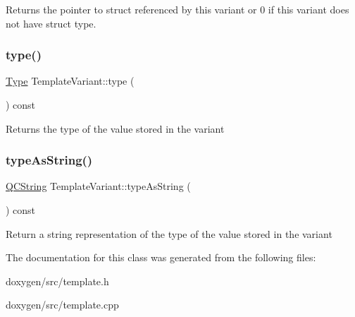 Returns the pointer to struct referenced by this variant or 0 if this variant does not have struct type. \mbox{\label{class_template_variant_a44564decc01226f38116fe78461bb912}} 
\subsubsection{\texorpdfstring{type()}{type()}}
{\footnotesize\ttfamily \mbox{\hyperlink{class_template_variant_a4c0d322ba971480bfbd2a8f418eadc81}{Type}} Template\+Variant\+::type (\begin{DoxyParamCaption}{ }\end{DoxyParamCaption}) const\hspace{0.3cm}{\ttfamily [inline]}}

Returns the type of the value stored in the variant \mbox{\label{class_template_variant_aa3367e7e77d68c0164f83c951906a608}} 
\subsubsection{\texorpdfstring{typeAsString()}{typeAsString()}}
{\footnotesize\ttfamily \mbox{\hyperlink{class_q_c_string}{Q\+C\+String}} Template\+Variant\+::type\+As\+String (\begin{DoxyParamCaption}{ }\end{DoxyParamCaption}) const\hspace{0.3cm}{\ttfamily [inline]}}

Return a string representation of the type of the value stored in the variant 

The documentation for this class was generated from the following files\+:\begin{DoxyCompactItemize}
\item 
doxygen/src/template.\+h\item 
doxygen/src/template.\+cpp\end{DoxyCompactItemize}
